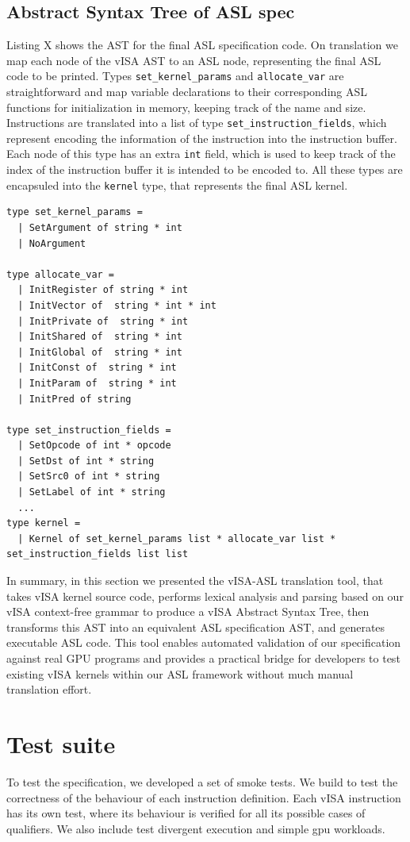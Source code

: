 \subsection{Abstract Syntax Tree of ASL spec}
Listing X shows the AST for the final ASL specification code. On translation we
map each node of the vISA AST to an ASL node, representing the final ASL code
to be printed. Types \texttt{set\_kernel\_params} and \texttt{allocate\_var}
are straightforward and map variable declarations to their corresponding ASL
functions for initialization in memory, keeping track of the name and size.
Instructions are translated into a list of type
\texttt{set\_instruction\_fields}, which represent encoding the information of
the instruction into the instruction buffer. Each node of this type has an
extra \texttt{int} field, which is used to keep track of the index of the
instruction buffer it is intended to be encoded to. All these types are
encapsuled into the \texttt{kernel} type, that represents the final ASL kernel.
\begin{lstlisting}
type set_kernel_params =
  | SetArgument of string * int
  | NoArgument

type allocate_var = 
  | InitRegister of string * int
  | InitVector of  string * int * int
  | InitPrivate of  string * int
  | InitShared of  string * int
  | InitGlobal of  string * int
  | InitConst of  string * int
  | InitParam of  string * int
  | InitPred of string

type set_instruction_fields =
  | SetOpcode of int * opcode
  | SetDst of int * string
  | SetSrc0 of int * string
  | SetLabel of int * string
  ...
type kernel = 
  | Kernel of set_kernel_params list * allocate_var list * set_instruction_fields list list
\end{lstlisting}

In summary, in this section we presented the vISA-ASL translation tool, that
takes vISA kernel source code, performs lexical analysis and parsing based on
our vISA context-free grammar to produce a vISA Abstract Syntax Tree, then
transforms this AST into an equivalent ASL specification AST, and generates
executable ASL code. This tool enables automated validation of our
specification against real GPU programs and provides a practical bridge for
developers to test existing vISA kernels within our ASL framework without much
manual translation effort.

\section{Test suite}
To test the specification, we developed a set of smoke tests. We build to test
the correctness of the behaviour of each instruction definition. Each vISA
instruction has its own test, where its behaviour is verified for all its
possible cases of qualifiers. We also include test divergent execution and
simple gpu workloads.

